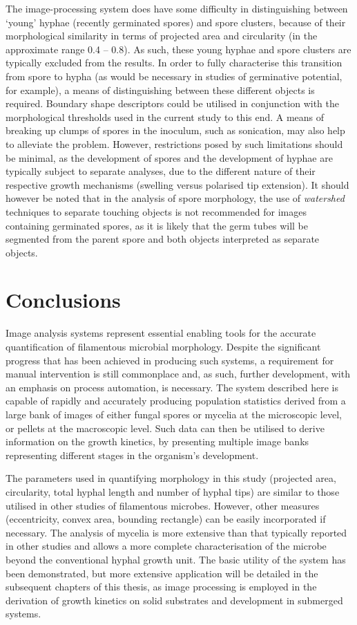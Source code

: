 The image-processing system does have some difficulty in distinguishing between \lq young' hyphae (recently germinated spores) and spore clusters, because of their morphological similarity in terms of projected area and circularity (in the approximate range 0.4 -- 0.8). As such, these young hyphae and spore clusters are typically excluded from the results. In order to fully characterise this transition from spore to hypha (as would be necessary in studies of germinative potential, for example), a means of distinguishing between these different objects is required. Boundary shape descriptors \cite{wilson2002,pazoti2005} could be utilised in conjunction with the morphological thresholds used in the current study to this end. A means of breaking up clumps of spores in the inoculum, such as sonication, may also help to alleviate the problem. However, restrictions posed by such limitations should be minimal, as the development of spores and the development of hyphae are typically subject to separate analyses, due to the different nature of their respective growth mechanisms (swelling versus polarised tip extension). It should however be noted that in the analysis of spore morphology, the use of \emph{watershed} techniques to separate touching objects is not recommended for images containing germinated spores, as it is likely that the germ tubes will be segmented from the parent spore and both objects interpreted as separate objects.

\section{Conclusions}

Image analysis systems represent essential enabling tools for the accurate quantification of filamentous microbial morphology. Despite the significant progress that has been achieved in producing such systems, a requirement for manual intervention is still commonplace and, as such, further development, with an emphasis on process automation, is necessary. The system described here is capable of rapidly and accurately producing population statistics derived from a large bank of images of either fungal spores or mycelia at the microscopic level, or pellets at the macroscopic level. Such data can then be utilised to derive information on the growth kinetics, by presenting multiple image banks representing different stages in the organism's development.

The parameters used in quantifying morphology in this study (projected area, circularity, total hyphal length and number of hyphal tips) are similar to those utilised in other studies of filamentous microbes. However, other measures (eccentricity, convex area, bounding rectangle) can be easily incorporated if necessary. The analysis of mycelia is more extensive than that typically reported in other studies and allows a more complete characterisation of the microbe beyond the conventional hyphal growth unit. The basic utility of the system has been demonstrated, but more extensive application will be detailed in the subsequent chapters of this thesis, as image processing is employed in the derivation of growth kinetics on solid substrates and development in submerged systems.